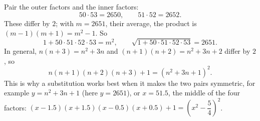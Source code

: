 Pair the outer factors and the inner factors:
\[
50\cdot53=2650,\qquad 51\cdot52=2652 .
\]
These differ by $2$; with $m=2651$, their average, the product is $(m-1)(m+1)=m^2-1$. So
\[
1+50\cdot51\cdot52\cdot53=m^2,\qquad\sqrt{1+50\cdot51\cdot52\cdot53}=\boxed{2651}.
\]
In general, $n(n+3)=n^2+3n$ and $(n+1)(n+2)=n^2+3n+2$ differ by $2$, so
\[
n(n+1)(n+2)(n+3)+1=(n^2+3n+1)^2 .
\]
This is why a substitution works best when it makes the two pairs symmetric, for example $y=n^2+3n+1$ (here $y=2651$), or $x=51.5$, the middle of the four factors: $(x-1.5)(x+1.5)(x-0.5)(x+0.5)+1=\left(x^2-\dfrac{5}{4}\right)^2$.
